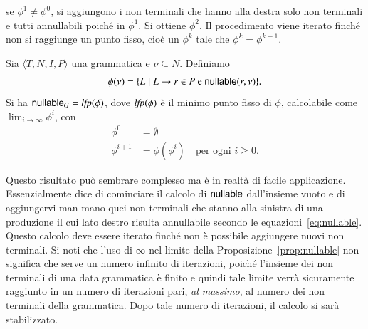 se $\phi^1\not=\phi^0$, si aggiungono i non terminali che hanno alla
destra solo non terminali e tutti annullabili poich\'e in $\phi^1$.
Si ottiene \cosi $\phi^2$. Il procedimento viene iterato finch\'e
non si raggiunge un punto fisso, cio\`e un $\phi^k$ tale che
$\phi^k=\phi^{k+1}$.
%
\begin{proposition}\label{prop:nullable}
Sia $\langle T,N,I,P\rangle$ una grammatica e $\nu\subseteq N$.
Definiamo
\[
  \phi(\nu)=\{L\mid L\to r\in P\text{ e }\mathsf{nullable}(r,\nu)\}.
\]
Si ha $\mathsf{nullable}_G=\mathit{lfp}(\phi)$, dove $\mathit{lfp}(\phi)$ \`e il minimo punto
fisso di $\phi$, calcolabile come $\lim_{i\to\infty}\phi^i$, con
\begin{align*}
  \phi^0&=\emptyset\\
  \phi^{i+1}&=\phi(\phi^i)\quad\text{per ogni $i\ge 0$.}
\end{align*}
\end{proposition}
%
Questo risultato pu\`o sembrare complesso ma \`e in realt\`a di facile
applicazione. Essenzialmente dice di cominciare il calcolo
di $\mathsf{nullable}$ dall'insieme vuoto e di aggiungervi man mano quei non terminali
che stanno alla sinistra di una produzione il cui lato destro risulta
annullabile secondo le equazioni~\eqref{eq:nullable}. Questo calcolo deve
essere iterato finch\'e non \`e \piu possibile aggiungere nuovi non terminali.
Si noti che l'uso di $\infty$ nel limite della Proposizione~\ref{prop:nullable}
non significa che serve un numero infinito di iterazioni, poich\'e l'insieme
dei non terminali di una data grammatica
\`e finito e quindi tale limite verr\`a sicuramente raggiunto
in un numero di iterazioni pari, \emph{al massimo}, al numero dei non terminali
della grammatica. Dopo tale numero di iterazioni, il calcolo si sar\`a
stabilizzato.

